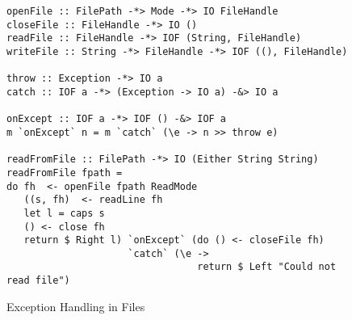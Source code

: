 \begin{figure}[h]
  \begin{framed}
    \begin{verbatim}
openFile :: FilePath -*> Mode -*> IO FileHandle
closeFile :: FileHandle -*> IO ()
readFile :: FileHandle -*> IOF (String, FileHandle)
writeFile :: String -*> FileHandle -*> IOF ((), FileHandle)

throw :: Exception -*> IO a
catch :: IOF a -*> (Exception -> IO a) -&> IO a

onExcept :: IOF a -*> IOF () -&> IOF a
m `onExcept` n = m `catch` (\e -> n >> throw e)

readFromFile :: FilePath -*> IO (Either String String)
readFromFile fpath =
do fh  <- openFile fpath ReadMode
   ((s, fh)  <- readLine fh
   let l = caps s
   () <- close fh
   return $ Right l) `onExcept` (do () <- closeFile fh)
                     `catch` (\e ->
                                 return $ Left "Could not read file")
    \end{verbatim}
  \end{framed}
  \caption{Exception Handling in Files}
  \label{fig:qub-file-exceptions}
\end{figure}


